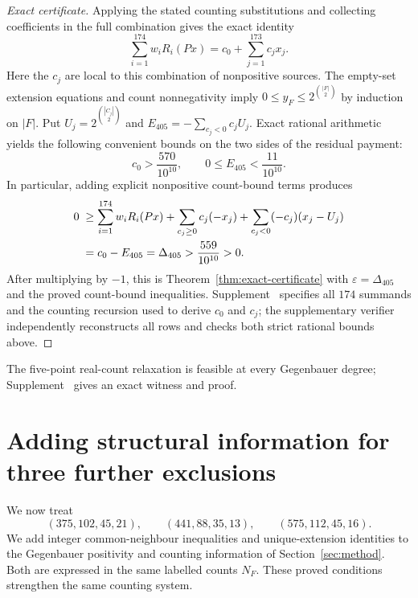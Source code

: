 \documentclass[11pt]{article}
\theoremstyle{remark}
\numberwithin{equation}{section}
\begin{document}
\begin{proof}[Exact certificate]
Applying the stated counting substitutions and collecting coefficients
in the full combination gives the exact identity
\[
 \sum_{i=1}^{174}w_iR_i(Px)=c_0+\sum_{j=1}^{173}c_jx_j.
\]
Here the $c_j$ are local to this combination of nonpositive sources.
The empty-set extension equations and count nonnegativity imply
$0\le y_F\le2^{\binom{|F|}{2}}$ by induction on $|F|$.
Put $U_j=2^{\binom{|C_j|}{2}}$ and
$E_{405}=-\sum_{c_j<0}c_jU_j$. Exact rational arithmetic yields the
following convenient bounds on the two sides of the residual payment:
\[
 c_0>\frac{570}{10^{10}},\qquad
 0\le E_{405}<\frac{11}{10^{10}}.
\]
In particular, adding explicit nonpositive count-bound terms produces
\begin{align}
 0\;&\ge\sum_{i=1}^{174}w_iR_i(Px)
       +\sum_{c_j\ge0}c_j(-x_j)
       +\sum_{c_j<0}(-c_j)(x_j-U_j)\notag\\
 &=c_0-E_{405}=\Delta_{405}
   >\frac{559}{10^{10}}>0.
 \label{eq:405-counting-margin}
\end{align}
After multiplying by $-1$, this is Theorem~\ref{thm:exact-certificate}
with $\varepsilon=\Delta_{405}$ and the proved count-bound inequalities.
Supplement~\cite{supp405} specifies all
$174$ summands and the counting recursion used to derive $c_0$ and
$c_j$; the supplementary verifier independently reconstructs all rows
and checks both strict rational bounds above.
\end{proof}


The five-point real-count relaxation is feasible at every Gegenbauer
degree; Supplement~\cite[Section~S2]{supp405} gives an exact witness and proof.

\section{Adding structural information for three further exclusions}
\label{sec:structural}

We now treat
\[
 (375,102,45,21),\qquad(441,88,35,13),\qquad(575,112,45,16).
\]
We add integer common-neighbour inequalities and unique-extension
identities to the Gegenbauer positivity and counting information of
Section~\ref{sec:method}. Both are expressed in the same labelled counts
$N_F$. These proved conditions strengthen the same counting system.
\end{document}
